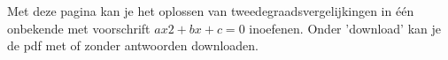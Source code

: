 \documentclass{ximera}
\begin{document}
	\author{Wiskunde Op Maat}

Met deze pagina kan je het oplossen van tweedegraadsvergelijkingen in één onbekende met voorschrift \(ax2+bx+c=0\) inoefenen. 
Onder 'download' kan je de pdf met of zonder antwoorden downloaden.

\newcommand{\choicetwee}{{\wordChoice{\choice[correct]{twee}\choice{één}\choice{geen}}}}
\newcommand{\choiceeen}{{\wordChoice{\choice{twee}\choice[correct]{één}\choice{geen}}}}
\newcommand{\choicegeen}{{\wordChoice{\choice{twee}\choice{één}\choice[correct]{geen}}}}

\newcommand{\choicepositief}{{\wordChoice{\choice[correct]{positief}\choice{nul}\choice{negatief}}}}
\newcommand{\choicenul}{{\wordChoice{\choice{positief}\choice[correct]{nul}\choice{negatief}}}}
\newcommand{\choicenegatief}{{\wordChoice{\choice{positief}\choice{nul}\choice[correct]{negatief}}}}
 
\end{document}
